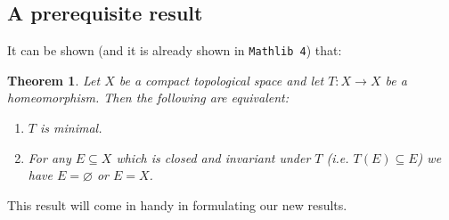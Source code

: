 \documentclass[11pt]{article}
\newtheorem{theorem}{Theorem}
\theoremstyle{definition}              %
\theoremstyle{definition}              %
\theoremstyle{definition}              %
\begin{document}
\subsection{A prerequisite result}
It can be shown (and it is already shown in \verb|Mathlib 4|) that:
\begin{theorem}\label{thm1}
    Let $X$ be a compact topological space and let $T: X \to X$ be a homeomorphism. Then the following are equivalent:
    \begin{enumerate}
        \item [(a)] $T$ is minimal.
        \item [(b)] For any $E \subseteq X$ which is closed and  invariant under $T$ (i.e. $T(E) \subseteq E$) we have $E = \varnothing$ or $E=X$.
    \end{enumerate}
\end{theorem}

\begin{comment}
A proof can be found in the lecture notes by Ceglie (see \citep[Prop.~1.13,p.~13]{ceglie}). This was implemented in Mathlib 4 by Kudryashov as follows \citep{kudry}:

\begin{lstlisting}
class MulAction.IsMinimal (M α : Type*) [Monoid M] [TopologicalSpace α] [MulAction M α] :
    Prop where
  dense_orbit : ∀ x : α, Dense (MulAction.orbit M x)
  
theorem isMinimal_iff_isClosed_smul_invariant (M G : Type*) {α : Type*} [Monoid M] [Group G] [TopologicalSpace α] [MulAction M α]
  [MulAction G α] [ContinuousConstSMul M α] :
    IsMinimal M α ↔ ∀ s : Set α, IsClosed s → (∀ c : M, c • s ⊆ s) → s = ∅ ∨ s = univ
\end{lstlisting}

Notice that this version of the theorem is written in a much more general way and writing the action as a multiplicative action as opposed to an additive action.
\end{comment}

This result will come in handy in formulating our new results.
\end{document}
